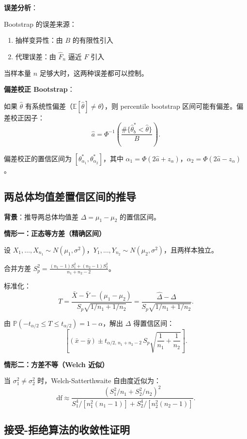 \textbf{误差分析}：

Bootstrap 的误差来源：
\begin{enumerate}
\item 抽样变异性：由 $B$ 的有限性引入
\item 代理误差：由 $\widehat{F}_n$ 逼近 $F$ 引入
\end{enumerate}

当样本量 $n$ 足够大时，这两种误差都可以控制。

\textbf{偏差校正 Bootstrap}：

如果 $\widehat{\theta}$ 有系统性偏差（$\mathbb{E}[\widehat{\theta}] \neq \theta$），则 percentile bootstrap 区间可能有偏差。偏差校正因子：
\[
\widehat{a} = \Phi^{-1}\left(\frac{\#\{\widehat{\theta}^*_b < \widehat{\theta}\}}{B}\right).
\]

偏差校正的置信区间为 $\left[ \theta^*_{\alpha_1}, \theta^*_{\alpha_2} \right]$，其中 $\alpha_1 = \Phi(2\widehat{a} + z_\alpha)$，$\alpha_2 = \Phi(2\widehat{a} - z_\alpha)$。

\subsection{两总体均值差置信区间的推导}\label{sec:derivation-two-sample-ci}

\textbf{背景}：推导两总体均值差 $\Delta = \mu_1 - \mu_2$ 的置信区间。

\textbf{情形一：正态等方差（精确区间）}

设 $X_1, \ldots, X_{n_1} \sim N(\mu_1, \sigma^2)$，$Y_1, \ldots, Y_{n_2} \sim N(\mu_2, \sigma^2)$，且两样本独立。

合并方差 $S_p^2 = \frac{(n_1-1)S_1^2 + (n_2-1)S_2^2}{n_1+n_2-2}$。

标准化：
\[
T = \frac{\bar{X} - \bar{Y} - (\mu_1-\mu_2)}{S_p\sqrt{1/n_1 + 1/n_2}}
= \frac{\widehat{\Delta} - \Delta}{S_p\sqrt{1/n_1 + 1/n_2}}.
\]

由 $\mathbb{P}(-t_{\alpha/2} \leq T \leq t_{\alpha/2}) = 1-\alpha$，解出 $\Delta$ 得置信区间：
\[
\left[(\bar{x}-\bar{y}) \pm t_{\alpha/2,\,n_1+n_2-2}\,S_p\sqrt{\frac{1}{n_1}+\frac{1}{n_2}}\right].
\]

\textbf{情形二：方差不等（Welch 近似）}

当 $\sigma_1^2 \neq \sigma_2^2$ 时，Welch-Satterthwaite 自由度近似为：
\[
\mathrm{df} \approx \frac{\left(S_1^2/n_1 + S_2^2/n_2\right)^2}
{S_1^4/[n_1^2(n_1-1)] + S_2^4/[n_2^2(n_2-1)]}.
\]

\subsection{接受-拒绝算法的收敛性证明}\label{sec:derivation-accept-reject}

